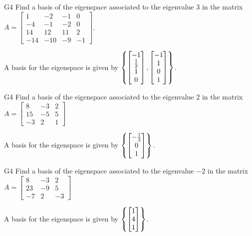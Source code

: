 \begin{problem}{G4}
Find a basis of the eigenspace associated to the eigenvalue $3$ in the matrix $A=\begin{bmatrix}1 & -2 & -1 & 0 \\ -4 & -1 & -2 & 0 \\ 14 & 12 & 11 & 2 \\ -14 & -10 & -9 & -1\end{bmatrix}$.
\end{problem}
\begin{solution}
A basis for the eigenspace is given by $\left\{\begin{bmatrix} -1 \\ \frac{1}{2} \\ 1 \\ 0 \end{bmatrix},\begin{bmatrix} -1 \\ 1 \\ 0 \\ 1 \end{bmatrix}\right\}$.
\end{solution}


\begin{problem}{G4}
Find a basis of the eigenspace associated to the eigenvalue $2$ in the matrix $A=\begin{bmatrix}8 & -3 & 2 \\ 15 & -5 & 5 \\ -3 & 2 & 1\end{bmatrix}$
\end{problem}
\begin{solution}
A basis for the eigenspace is given by $\left\{\begin{bmatrix} -\frac{1}{3} \\ 0 \\ 1 \end{bmatrix}\right\}$.
\end{solution}

\begin{problem}{G4}
Find a basis of the eigenspace associated to the eigenvalue $-2$ in the matrix $A=\begin{bmatrix}8 & -3 & 2 \\ 23 & -9 & 5 \\ -7 & 2 & -3\end{bmatrix}$
\end{problem}
\begin{solution}
A basis for the eigenspace is given by $\left\{\begin{bmatrix} 1 \\ 4 \\ 1 \end{bmatrix}\right\}$.
\end{solution}

